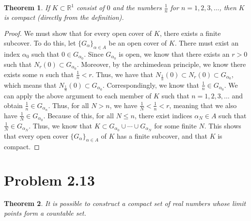\documentclass[psamsfonts]{amsart}
\newtheorem{thm}{Theorem}[section]
\theoremstyle{definition}
\theoremstyle{remark}
\numberwithin{equation}{section}
\begin{document}
\begin{thm}
If $K \subset \mathbb{R}^1$ consist of $0$ and the numbers $\frac{1}{n}$ for $n = 1,2,3,\ldots$, then $K$ is compact (directly from the definition).
\end{thm}

\begin{proof}
We must show that for every open cover of $K$, there exists a finite subcover. To do this, let $\{G_{\alpha}\}_{\alpha \in A}$ be an open cover of $K$. There must exist an index $\alpha_0$ such that $ 0 \in G_{\alpha_0}$. Since $G_{\alpha_0}$ is open, we know that there exists an $r > 0$ such that $N_r(0) \subset G_{\alpha_0}$. Moreover, by the archimedean principle, we know there exists some $n$ such that $\frac{1}{n} < r$. Thus, we have that $N_{\frac{1}{n}}(0) \subset N_r(0) \subset G_{\alpha_0}$, which means that $N_{\frac{1}{n}}(0) \subset G_{\alpha_0}$. Correspondingly, we know that $\frac{1}{n} \in G_{\alpha_0}$. We can apply the above argument to each member of $K$ such that $n = 1,2,3,\ldots$ and obtain $\frac{1}{n} \in G_{\alpha_n}$. Thus, for all $N >n$, we have $\frac{1}{N} < \frac{1}{n} < r$, meaning that we also have $\frac{1}{N} \in G_{\alpha_0}$. Because of this, for all $ N \leq n$, there exist indices $\alpha_N \in A$ such that $\frac{1}{N} \in G_{\alpha_N}$. Thus, we know that $ K \subset G_{\alpha_0} \cup \cdots \cup G_{\alpha_N}$ for some finite $N$. This shows that every open cover $\{G_{\alpha}\}_{\alpha \in A}$ of $K$ has a finite subcover, and that $K$ is compact.
\end{proof}

\section{Problem 2.13}

\begin{thm}
It is possible to construct a compact set of real numbers whose limit points form a countable set.
\end{thm}
\end{document}
